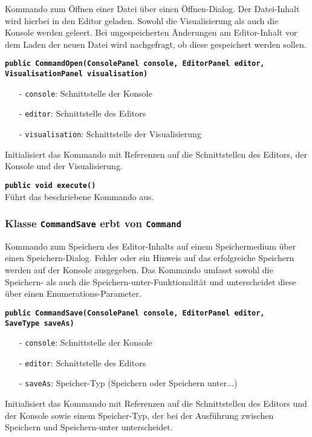 \documentclass[parskip=full,11pt,twoside]{scrartcl}
\begin{document}
Kommando zum Öffnen einer Datei über einen Öffnen-Dialog. Der Datei-Inhalt wird hierbei in den Editor geladen. Sowohl die Visualisierung als auch die Konsole werden geleert. Bei ungespeicherten Änderungen am Editor-Inhalt vor dem Laden der neuen Datei wird nachgefragt, ob diese gespeichert werden sollen.

\textbf{\texttt{public CommandOpen(ConsolePanel console, EditorPanel editor,\\VisualisationPanel visualisation)}}
\begin{itemize}[noitemsep]
	\item[-] \texttt{console}: Schnittstelle der Konsole
	\item[-] \texttt{editor}: Schnittstelle des Editors
	\item[-] \texttt{visualisation}: Schnittstelle der Visualisierung
\end{itemize}
Initialisiert das Kommando mit Referenzen auf die Schnittstellen des Editors, der Konsole und der Visualisierung.

\textbf{\texttt{public void execute()}}\\
Führt das beschriebene Kommando aus.

\subsubsection{Klasse \texttt{CommandSave} erbt von \texttt{Command}}

Kommando zum Speichern des Editor-Inhalts auf einem Speichermedium über einen Speichern-Dialog. Fehler oder ein Hinweis auf das erfolgreiche Speichern werden auf der Konsole ausgegeben. Das Kommando umfasst sowohl die Speichern- als auch die Speichern-unter-Funktionalität und unterscheidet diese über einen Enumerations-Parameter.

\textbf{\texttt{public CommandSave(ConsolePanel console, EditorPanel editor,\\SaveType saveAs)}}
\begin{itemize}[noitemsep]
	\item[-] \texttt{console}: Schnittstelle der Konsole
	\item[-] \texttt{editor}: Schnittstelle des Editors
	\item[-] \texttt{saveAs}: Speicher-Typ (Speichern oder Speichern unter...)
\end{itemize}
Initialisiert das Kommando mit Referenzen auf die Schnittstellen des Editors und der Konsole sowie einem Speicher-Typ, der bei der Ausführung zwischen Speichern und Speichern-unter unterscheidet.
\end{document}

